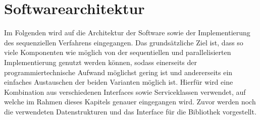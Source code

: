 \section{Softwarearchitektur}
\label{sec:software_architecture}
Im Folgenden wird auf die Architektur der Software sowie der Implementierung des sequenziellen Verfahrens eingegangen. Das grundsätzliche Ziel ist, dass so viele Komponenten wie möglich von der sequentiellen und parallelisierten Implementierung genutzt werden können, sodass einerseits der programmiertechnische Aufwand möglichst gering ist und andererseits ein einfaches Austauschen der beiden Varianten möglich ist. Hierfür wird eine Kombination aus verschiedenen Interfaces sowie Serviceklassen verwendet, auf welche im Rahmen dieses Kapitels genauer eingegangen wird. Zuvor werden noch die verwendeten Datenstrukturen und das Interface für die Bibliothek vorgestellt.
 
